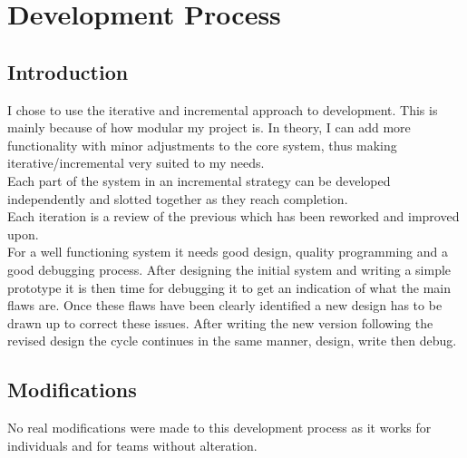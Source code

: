 \chapter{Development Process}

\section{Introduction}
I chose to use the iterative and incremental approach to development.  This is mainly because of how modular my project is.  In theory, I can add more functionality with minor adjustments to the core system, thus making iterative/incremental very suited to my needs.
\\Each part of the system in an incremental strategy can be developed independently and slotted together as they reach completion.
\\Each iteration is a review of the previous which has been reworked and improved upon.
\\For a well functioning system it needs good design, quality programming and a good debugging process.  After designing the initial system and writing a simple prototype it is then time for debugging it to get an indication of what the main flaws are.  Once these flaws have been clearly identified a new design has to be drawn up to correct these issues.  After writing the new version following the revised design the cycle continues in the same manner, design, write then debug.


\section{Modifications}
No real modifications were made to this development process as it works for individuals and for teams without alteration.

